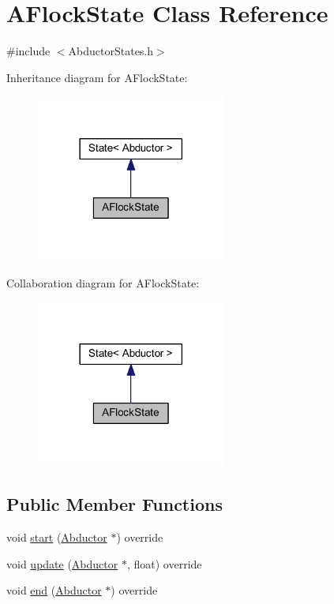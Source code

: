 \hypertarget{class_a_flock_state}{}\section{A\+Flock\+State Class Reference}
\label{class_a_flock_state}


{\ttfamily \#include $<$Abductor\+States.\+h$>$}



Inheritance diagram for A\+Flock\+State\+:\nopagebreak
\begin{figure}[H]
\begin{center}
\leavevmode
\includegraphics[width=177pt]{class_a_flock_state__inherit__graph}
\end{center}
\end{figure}


Collaboration diagram for A\+Flock\+State\+:\nopagebreak
\begin{figure}[H]
\begin{center}
\leavevmode
\includegraphics[width=177pt]{class_a_flock_state__coll__graph}
\end{center}
\end{figure}
\subsection*{Public Member Functions}
\begin{DoxyCompactItemize}
\item 
void \hyperlink{class_a_flock_state_a375255af2422bad8037325ea8ff86ddb}{start} (\hyperlink{class_abductor}{Abductor} $\ast$) override
\item 
void \hyperlink{class_a_flock_state_ac452fa27fac302918460575e5badae91}{update} (\hyperlink{class_abductor}{Abductor} $\ast$, float) override
\item 
void \hyperlink{class_a_flock_state_af81fa7c9e9eb5185e8cd950aceb758f3}{end} (\hyperlink{class_abductor}{Abductor} $\ast$) override
\end{DoxyCompactItemize}
